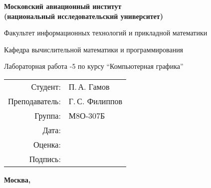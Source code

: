 \begin{titlepage}
\begin{center}
\bfseries
{\Large Московский авиационный институт\\ (национальный исследовательский университет)}

\vspace{48pt}
{\large Факультет информационных технологий и прикладной математики}

\vspace{36pt}
{\large Кафедра вычислительной математики и программирования}

\vspace{48pt}Лабораторная работа -5 по курсу 
\enquote{Компьютерная графика}
\end{center}
\vspace{72pt}

\begin{flushright}
\begin{tabular}{rl}
Студент: & П.\,А. Гамов \\
Преподаватель: & Г.\,С. Филиппов \\
Группа: & М8О-307Б \\
Дата: & \\
Оценка: & \\
Подпись: & \\
\end{tabular}
\end{flushright}
\vfill
\begin{center}
\bfseries
Москва, \the\year
\end{center}
\end{titlepage}

\pagebreak